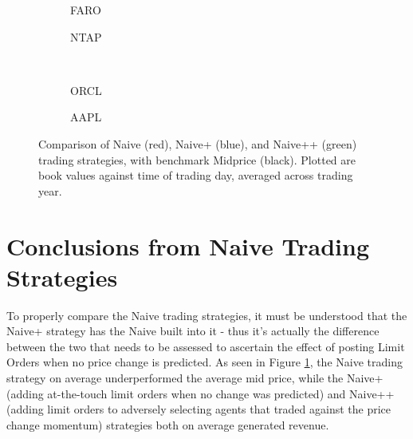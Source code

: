 \begin{figure}
\centering
\begin{subfigure}{.35\linewidth}
  \centering
  \setlength\figureheight{\linewidth} 
  \setlength\figurewidth{\linewidth}
  
  \caption{FARO}
\end{subfigure}%
\hfil%
\begin{subfigure}{.35\linewidth}
  \centering
  \setlength\figureheight{\linewidth}
  \setlength\figurewidth{\linewidth}
   
  \caption{NTAP}
\end{subfigure}\\
\vspace{1cm}
\begin{subfigure}{.35\linewidth}
  \centering
  \setlength\figureheight{\linewidth} 
  \setlength\figurewidth{\linewidth}
  
  \caption{ORCL}
\end{subfigure}%
\hfil%
\begin{subfigure}{.35\linewidth}
  \centering
  \setlength\figureheight{\linewidth}
  \setlength\figurewidth{\linewidth}
   
  \caption{AAPL}
\end{subfigure}%
  \caption{Comparison of Naive (red), Naive+ (blue), and Naive++ (green) trading strategies, with benchmark Midprice (black). Plotted are book values against time of trading day, averaged across trading year.}
  \label{fig:comp}
\end{figure}

\section{Conclusions from Naive Trading Strategies}

To properly compare the Naive trading strategies, it must be understood that the Naive+ strategy has the Naive built into it - thus it's actually the difference between the two that needs to be assessed to ascertain the effect of posting Limit Orders when no price change is predicted. As seen in Figure \ref{fig:comp}, the Naive trading strategy on average underperformed the average mid price, while the Naive+ (adding at-the-touch limit orders when no change was predicted) and Naive++ (adding limit orders to adversely selecting agents that traded against the price change momentum) strategies both on average generated revenue. 

